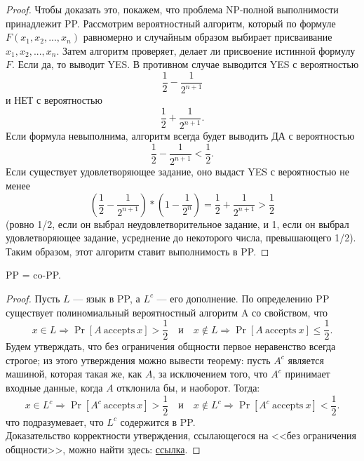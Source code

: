     \begin{proof}
        Чтобы доказать это, покажем, что проблема NP-полной выполнимости принадлежит PP. Рассмотрим вероятностный алгоритм, который по формуле $F(x_1, x_2, ..., x_n)$ равномерно и случайным образом выбирает присваивание $x_1, x_2, ..., x_n$. Затем алгоритм проверяет, делает ли присвоение истинной формулу $F$. Если да, то выводит YES. В противном случае выводится YES с вероятностью $$\frac{1}{2} - \frac{1}{2^{n+1}}$$ и НЕТ с вероятностью $$\frac{1}{2} + \frac{1}{2^{n+1}}.$$
        Если формула невыполнима, алгоритм всегда будет выводить ДА с вероятностью $$\frac{1}{2} - \frac{1}{2^{n+1}} < \frac{1}{2}.$$ Если существует удовлетворяющее задание, оно выдаст YES с вероятностью не менее $$(\frac{1}{2} - \frac{1}{2^{n+1}}) * (1 - \frac{1}{2^n}) = \frac{1}{2} + \frac{1}{2^{n+1}} > \frac{1}{2}$$ (ровно 1/2, если он выбрал неудовлетворительное задание, и 1, если он выбрал удовлетворяющее задание, усреднение до некоторого числа, превышающего 1/2). Таким образом, этот алгоритм ставит выполнимость в PP. 
    \end{proof}

    

    \begin{Thm}
        PP = co-PP.
    \end{Thm}
    
    \begin{proof}
        Пусть $L$ --- язык в PP, а $L^c$ --- его дополнение. По определению PP существует полиномиальный вероятностный алгоритм A со свойством, что
        $$x \in L \Rightarrow \Pr [A \ {\text{accepts}} \ x] > {\frac{1}{2}} \quad {\text{и}} \quad x \not \in L \Rightarrow \Pr [A \ {\text{accepts}} \ x] \leq {\frac{1}{2}}.$$
        Будем утверждать, что без ограничения общности первое неравенство всегда строгое; из этого утверждения можно вывести теорему: пусть $A^{c}$ является машиной, которая такая же, как $A$, за исключением того, что $A^{c}$ принимает входные данные, когда $A$ отклонила бы, и наоборот. Тогда:
        $$x \in L^{c} \Rightarrow \Pr [A^{c} \ {\text{accepts}} \ x] > {\frac{1}{2}} \quad {\text{и}} \quad x \not \in L^{c} \Rightarrow \Pr [A^{c} \ {\text{accepts}} \ x] < {\frac{1}{2}}.$$
        что подразумевает, что $L^{c}$ содержится в PP.\\
        Доказательство корректности утверждения, ссылающегося на <<без ограничения общности>>, можно найти здесь: \href{https://en.wikipedia.org/wiki/PP_(complexity)}{ссылка}.
    \end{proof}

